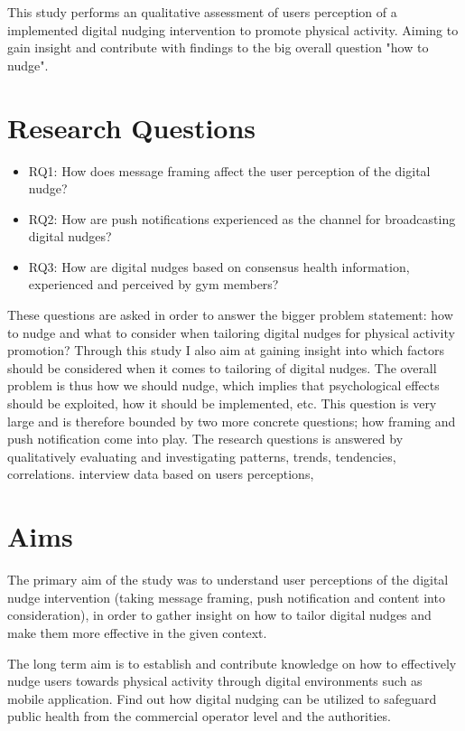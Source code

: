 This study performs an qualitative assessment of users perception of a implemented digital nudging intervention to promote physical activity. Aiming to gain insight and contribute with findings to the big overall question "how to nudge".

\section{Research Questions}
\begin{itemize}
\item RQ1: How does message framing affect the user perception of the digital nudge?
\item RQ2: How are push notifications experienced as the channel for broadcasting digital nudges?
\item RQ3: How are digital nudges based on consensus health information, experienced and perceived by gym members? 
\end{itemize}

These questions are asked in order to answer the bigger problem statement: how to nudge and what to consider when tailoring digital nudges for physical activity promotion? Through this study I also aim at gaining insight into which factors should be considered when it comes to tailoring of digital nudges. The overall problem is thus how we should nudge, which implies that psychological effects should be exploited, how it should be implemented, etc. This question is very large and is therefore bounded by two more concrete questions; how framing and push notification come into play. The research questions is answered by qualitatively evaluating and investigating patterns, trends, tendencies, correlations. interview data based on users perceptions,  

\section{Aims}
The primary aim of the study was to understand user perceptions of the digital nudge intervention (taking message framing, push notification and content into consideration), in order to gather insight on how to tailor digital nudges and make them more effective in the given context. 

The long term aim is to establish and contribute knowledge on how to effectively nudge users towards physical activity through digital environments such as mobile application. Find out how digital nudging can be utilized to safeguard public health from the commercial operator level and the authorities. 


